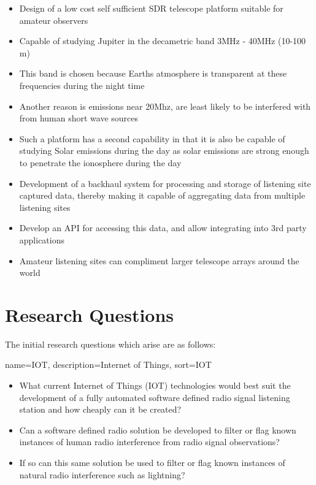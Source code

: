 \documentclass[runningheads,a4paper]{llncs}
\begin{document}
\begin{itemize}
  \item Design of a low cost self sufficient SDR telescope platform suitable for amateur observers
  \item Capable of studying Jupiter in the decametric band 3MHz - 40MHz (10-100 m)
  \item This band is chosen because Earths atmosphere is transparent at these frequencies during the night time
  \item Another reason is emissions near 20Mhz, are least likely to be interfered with from human short wave sources
  \item Such a platform has a second capability in that it is also be capable of studying Solar emissions during the day as solar emissions are strong enough to penetrate the ionosphere during the day
  \item Development of a backhaul system for processing and storage of listening site captured data, thereby making it capable of aggregating data from multiple listening sites
  \item Develop an API for accessing this data, and allow integrating into 3rd party applications
  \item Amateur listening sites can compliment larger telescope arrays around the world
\end{itemize}


%
%
\section*{Research Questions}
The initial research questions which arise are as follows:

{
  name={IOT},
  description={Internet of Things},
  sort=IOT
}

\begin{itemize}
  \item What current Internet of Things (\gls{IOT}) technologies would best suit the development of a fully automated software defined radio signal listening station and how cheaply can it be created?
  \item Can a software defined radio solution be developed to filter or flag known instances of human radio interference from radio signal observations?
  \item If so can this same solution be used to filter or flag known instances of natural radio interference such as lightning?
\end{itemize}
\end{document}
